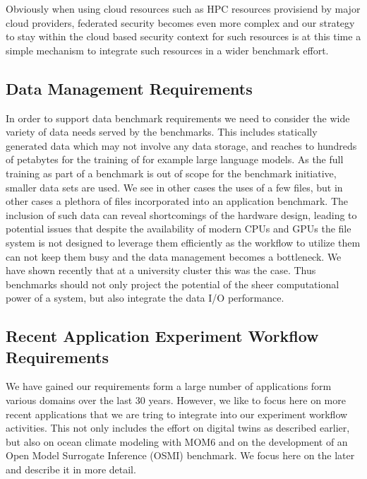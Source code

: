 \documentclass[utf8]{FrontiersinVancouver} %
\newcommand{\TODO}[1]{\todo[inline]{#1}}
\begin{document}
Obviously when using cloud resources such as HPC resources provisiend by major cloud providers, federated security becomes even more complex and our strategy to stay within the cloud based security context for such resources is at this time a simple mechanism to integrate such resources in a wider benchmark effort.


\subsection{Data Management Requirements}
\label{sec:data-requirements}

In order to support data benchmark requirements we need to consider the wide variety of data needs served by the benchmarks. This includes statically generated data which may not involve any data storage, and reaches to hundreds of petabytes for the training of for example large language models. As the full training as part of a benchmark is out of scope for the benchmark initiative, smaller data sets are used. 
We see in other cases the uses of a few files, but in other cases a plethora of files incorporated into an application benchmark. The inclusion of such data can reveal shortcomings of the hardware design, leading to potential issues that despite the availability of modern CPUs and GPUs the file system is not designed to leverage them efficiently as the workflow to utilize them can not keep them busy and the data management becomes a bottleneck. We have shown recently that at a university cluster this was the case. Thus benchmarks should not only project the potential of the sheer computational power of a system, but also integrate the data I/O performance.

\TODO{this is duplicated in tier section}

\subsection{Recent Application Experiment Workflow Requirements}

We have gained our requirements form a large number of applications form various domains over the last 30 years. However, we like to focus here on more recent applications that we are tring to integrate into our experiment workflow activities. This not only includes the effort on digital twins as described earlier, but also on ocean climate modeling with MOM6 and on the development of an Open Model Surrogate Inference (OSMI) benchmark. We focus here on the later and describe it in more detail.
\end{document}
